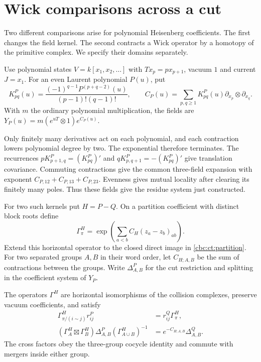 \section{Wick comparisons across a cut}
\label{cbc:ct:wick}

Two different comparisons arise for polynomial Heisenberg
coefficients. The first changes the field kernel. The second
contracts a Wick operator by a homotopy of the primitive
complex. We specify their domains separately.

Use polynomial states $V=k[x_1,x_2,\ldots]$ with
$Tx_p=px_{p+1}$, vacuum $1$ and current $J=x_1$. For an even
Laurent polynomial $P(u)$, put
\begin{equation}\label{cbc:ct:kernel}
 K^P_{pq}(u)=\frac{(-1)^{q-1}P^{(p+q-2)}(u)}
                         {(p-1)!(q-1)!},\qquad
 C_P(u)=\sum_{p,q\geq1}K^P_{pq}(u)
                         \partial_{x_p}\otimes\partial_{x_q}.
\end{equation}
With $m$ the ordinary polynomial multiplication, the fields are
$Y_P(u)=m(e^{uT}\otimes1)e^{C_P(u)}$.

Only finitely many derivatives act on each polynomial, and each
contraction lowers polynomial degree by two. The exponential
therefore terminates. The recurrences
$pK^P_{p+1,q}=(K^P_{pq})'$ and
$qK^P_{p,q+1}=-(K^P_{pq})'$ give translation covariance.
Commuting contractions give the common three-field expansion
with exponent $C_{P,12}+C_{P,13}+C_{P,23}$. Evenness gives
mutual locality after clearing its finitely many poles.
Thus these fields give the residue system just constructed.

For two such kernels put $H=P-Q$. On a partition coefficient
with distinct block roots define
\[
 \Gamma^H_\pi=\exp\left(\sum_{a<b}C_H(z_a-z_b)_{ab}\right).
\]
Extend this horizontal operator to the closed direct image
in \eqref{cbc:ct:partition}.
For two separated groups $A,B$ in their word order, let
$C_{H;A,B}$ be the sum of contractions between the groups.
Write $\Delta^P_{A,B}$ for the cut restriction and splitting
in the coefficient system of $Y_P$.

\begin{proposition}\label{cbc:ct:wick-cuts}
The operators $\Gamma^H$ are horizontal isomorphisms of the
collision complexes, preserve vacuum coefficients, and satisfy
\begin{align}
 \Gamma^H_{\pi/(i\sim j)}r^P_{ij}
       &=r^Q_{ij}\Gamma^H_\pi,\label{cbc:ct:wick-contact}\\
 (\Gamma^H_A\boxtimes\Gamma^H_B)\Delta^P_{A,B}
                    (\Gamma^H_{A\cup B})^{-1}
       &=e^{-C_{H;A,B}}\Delta^Q_{A,B}.
                                  \label{cbc:ct:wick-cut}
\end{align}
The cross factors obey the three-group cocycle identity and
commute with mergers inside either group.
\end{proposition}

